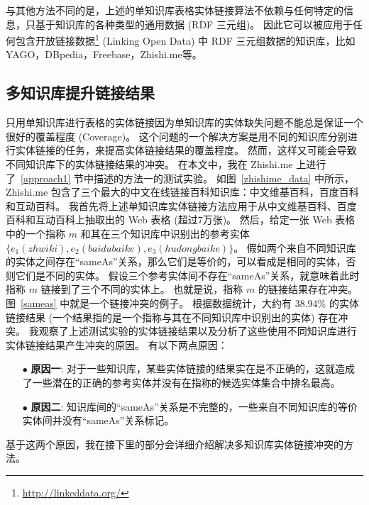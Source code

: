 与其他方法不同的是，上述的单知识库表格实体链接算法不依赖与任何特定的信息，只基于知识库的各种类型的通用数据 (RDF 三元组)。
因此它可以被应用于任何包含开放链接数据\footnote{\url{http://linkeddata.org/}} (Linking Open Data) 中 RDF 三元组数据的知识库，比如 YAGO\cite{suchanek2007yago}，DBpedia\cite{auer2007dbpedia}，Freebase\cite{bollacker2008freebase}，Zhishi.me\cite{niu2011zhishi}等。


\subsection{多知识库提升链接结果}\label{multiple}

只用单知识库进行表格的实体链接因为单知识库的实体缺失问题不能总是保证一个很好的覆盖程度 (Coverage)。
这个问题的一个解决方案是用不同的知识库分别进行实体链接的任务，来提高实体链接结果的覆盖程度。
然而，这样又可能会导致不同知识库下的实体链接结果的冲突。
在本文中，我在 Zhishi.me 上进行了~\ref{approach1} 节中描述的方法一的测试实验。
如图~\ref{zhishime_data} 中所示，Zhishi.me 包含了三个最大的中文在线链接百科知识库：中文维基百科，百度百科和互动百科。
我首先将上述单知识库实体链接方法应用于从中文维基百科、百度百科和互动百科上抽取出的 Web 表格 (超过7万张)。
然后，给定一张 Web 表格中的一个指称 $m$ 和其在三个知识库中识别出的参考实体 $\{e_1(zhwiki), e_2(baidubaike), e_3(hudongbaike)\}$。
假如两个来自不同知识库的实体之间存在``sameAs''关系，那么它们是等价的，可以看成是相同的实体，否则它们是不同的实体。
假设三个参考实体间不存在``sameAs''关系，就意味着此时指称 $m$ 链接到了三个不同的实体上。
也就是说，指称 $m$ 的链接结果存在冲突。图~\ref{sameas} 中就是一个链接冲突的例子。
根据数据统计，大约有 38.94\% 的实体链接结果 (一个结果指的是一个指称与其在不同知识库中识别出的实体) 存在冲突。
我观察了上述测试实验的实体链接结果以及分析了这些使用不同知识库进行实体链接结果产生冲突的原因。
有以下两点原因：
\begin{itemize}
  \item[$\bullet$] \textbf{原因一}: 对于一些知识库，某些实体链接的结果实在是不正确的，这就造成了一些潜在的正确的参考实体并没有在指称的候选实体集合中排名最高。
  \item[$\bullet$] \textbf{原因二}: 知识库间的``sameAs''关系是不完整的，一些来自不同知识库的等价实体间并没有``sameAs''关系标记。
\end{itemize}
基于这两个原因，我在接下里的部分会详细介绍解决多知识库实体链接冲突的方法。\par

